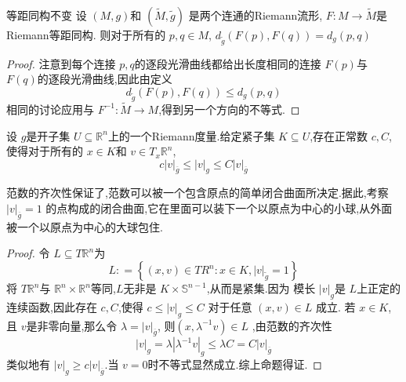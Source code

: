 \documentclass[../../几何与拓扑.tex]{subfiles}
\begin{document}
\begin{proposition}{等距同构不变}
    设 $ \left( M,g \right)  $和 $ \left( \tilde{M},\tilde{g} \right)  $  是两个连通的Riemann流形, $ F: M\to  \tilde{M} $是Riemann等距同构.
    则对于所有的 $ p,q \in M $, $ d _{\tilde{g}}\left( F\left( p \right),F\left( q \right)   \right) =  d _{g}\left( p,q \right)   $   
\end{proposition}
\begin{proof}
    注意到每个连接 $ p,q $的逐段光滑曲线都给出长度相同的连接 $ F\left( p \right)  $与 $ F\left( q \right)  $的逐段光滑曲线,因此由定义 $$
     d _{\tilde{g}}\left( F\left( p \right),F\left( q \right)   \right) \le  d _{g}\left( p,q \right) 
    $$相同的讨论应用与 $ F^{-1} :\tilde{M}\to M $,得到另一个方向的不等式.   
\end{proof}

\begin{lemma}\label{metric-compare}
    设 $ g $是开子集 $ U\subseteq \mathbb{R} ^{n} $上的一个Riemann度量.给定紧子集 $ K\subseteq U $,存在正常数 $ c,C $,使得对于所有的 $ x \in K $和 $ v \in T_{x}\mathbb{R} ^{n} $, $$
    c\left| v \right|_{\overline{g}} \le \left| v \right|_{g}\le C\left| v \right|_{\overline{g}} 
    $$      
\end{lemma}
\begin{note}
    范数的齐次性保证了,范数可以被一个包含原点的简单闭合曲面所决定.据此,考察 $ \left| v \right|_{\overline{g}}  = 1$ 的点构成的闭合曲面,它在里面可以装下一个以原点为中心的小球,从外面被一个以原点为中心的大球包住.
\end{note}
\begin{proof}
    令 $ L\subseteq  T \mathbb{R} ^{n} $为 $$
    L : = \left\{ \left( x,v \right)\in  T R^{n}: x\in K  ,\left| v \right|_{\tilde{g}} =1\right\}
    $$将 $ T \mathbb{R} ^{n} $与 $ \mathbb{R} ^{n}\times \mathbb{R} ^{n} $等同,$ L $无非是 $ K\times \mathbb{S}^{n-1} $,从而是紧集.因为
    模长 $ \left| v \right|_{g}  $是 $ L $上正定的连续函数,因此存在 $ c,C $,使得 $ c \le \left| v \right|_{g}\le C  $  对于任意 $ \left( x,v \right)\in L  $      成立.
    若 $ x \in K $,且 $ v $是非零向量,那么令 $ \lambda = \left| v \right|_{\overline{g}}  $, 则$ \left( x, \lambda^{-1} v \right)\in L  $   ,由范数的齐次性 $$
    \left| v \right|_{g} = \lambda \left|  \lambda ^{-1} v\right|_{g} \le \lambda C= C\left| v \right|_{ \overline{g}}   
    $$类似地有  $ \left| v \right|_{g}\ge c\left| v \right|_{\overline{g}}   $.当 $ v =0 $时不等式显然成立.综上命题得证.  
\end{proof}
\end{document}
